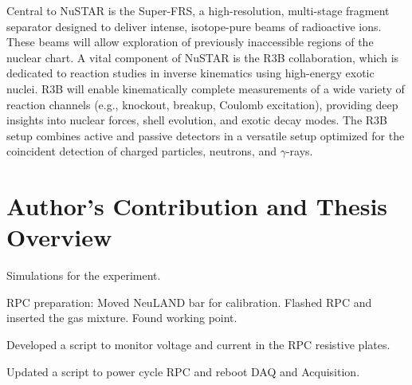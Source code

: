 \begin{itemize}
	Central to NuSTAR is the Super-FRS, a high-resolution, multi-stage fragment separator designed to deliver intense, isotope-pure beams of radioactive ions. These beams will allow exploration of previously inaccessible regions of the nuclear chart. A vital component of NuSTAR is the \gls{R3B} collaboration, which is dedicated to reaction studies in inverse kinematics using high-energy exotic nuclei. \gls{R3B} will enable kinematically complete measurements of a wide variety of reaction channels (e.g., knockout, breakup, Coulomb excitation), providing deep insights into nuclear forces, shell evolution, and exotic decay modes. The \gls{R3B} setup combines active and passive detectors in a versatile setup optimized for the coincident detection of charged particles, neutrons, and $\gamma$-rays.
\end{itemize}




\section{Author's Contribution and Thesis Overview}


Simulations for the experiment.

RPC preparation:
Moved NeuLAND bar for calibration. Flashed RPC and inserted the gas mixture. Found working point.

Developed a script to monitor voltage and current in the RPC resistive plates.

Updated a script to power cycle RPC and reboot DAQ and Acquisition.